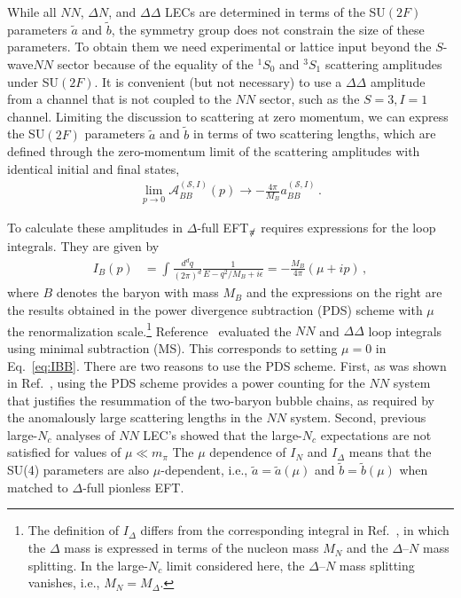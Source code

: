 \documentclass[nofootinbib, preprint, aps, prc, superscriptaddress,11pt]{revtex4-1}
\newcommand{\Nc}{\ensuremath{N_c}\xspace}
\newcommand{\NN}{\ensuremath{N\!N}\xspace}
\newcommand{\oneS}{\ensuremath{{{}^{1}\!S_0}}\xspace}
\newcommand{\threeS}{\ensuremath{{{}^{3}\!S_1}}\xspace}
\newcommand\Swave{$S$-wave\xspace}
\newcommand{\calA}{\ensuremath{\mathcal{A}}}
\newcommand{\1}{\mathbbm{1}}
\newcommand{\at}{\ensuremath{\tilde{a}}\xspace}
\newcommand{\bt}{\ensuremath{\tilde{b}}\xspace}
\newcommand{\mpi}{\ensuremath{m_\pi}}
\newcommand{\nopi}{\ensuremath{\pi\hskip-0.40em /}}
\newcommand{\eftnopi}{EFT$_{\nopi}$\xspace}
\newcommand{\D}{\ensuremath{\Delta}\xspace}
\newcommand{\DD}{\ensuremath{\Delta\Delta}\xspace}
\begin{document}
While all \NN, $\D N$, and \DD LECs are determined in terms of the SU$(2F)$ parameters \at and \bt, the symmetry group does not constrain the size of these parameters.  To obtain them we need experimental or lattice input beyond the \Swave \NN sector because of the equality of the \oneS and \threeS scattering amplitudes under SU$(2F)$.
It is convenient (but not necessary) to use a \DD amplitude from a channel that is not coupled to the \NN sector, such as the $S=3, I=1$ channel.
Limiting the discussion to scattering at zero momentum, we can express the SU$(2F)$ parameters $\at$ and $\bt$ in terms of two scattering lengths, which are defined through the zero-momentum limit of the scattering amplitudes with identical initial and final states, 
\begin{align}
\label{eq:ScatteringLengthDef}
        \lim_{p \to 0} \calA^{(\mathscr{S},I)}_{B B}(p) \to - \frac{4 \pi}{M_B} a^{(\mathscr{S},I)}_{B B} \, .
    \end{align}

To calculate these amplitudes in \D-full \eftnopi requires expressions for the loop integrals. They are given by 
\begin{align}
\label{eq:IBB}
    I_{B}(p) & = \int \frac{d^d q}{(2\pi)^d}\frac{1}{E-q^2/M_B + i\epsilon} = - \frac{M_B}{4\pi}(\mu + ip)\, , 
\end{align}
where $B$ denotes the baryon with mass $M_B$ and the expressions on the right are the results obtained in the power divergence subtraction (PDS) scheme \cite{Kaplan:1998tg} with $\mu$ the renormalization scale.\footnote{The definition of $I_{\D}$ differs from the corresponding integral in Ref.~\cite{Savage:1996tb}, in which the \D mass is expressed in terms of the nucleon mass $M_N$ and the \D{}--$N$ mass splitting.  In the large-\Nc limit considered here, the \D{}--$N$ mass splitting vanishes, i.e., $M_N=M_{\D}$.} 
Reference~\cite{Savage:1996tb} evaluated the \NN and \DD loop integrals using minimal subtraction (MS). 
This corresponds to setting $\mu = 0$ in Eq.~\eqref{eq:IBB}.
There are two reasons to use the PDS scheme. First, as was shown in Ref.~\cite{Kaplan:1998tg}, using the PDS scheme provides a power counting for the \NN system that justifies the resummation of the two-baryon bubble chains, as required by the anomalously large scattering lengths in the \NN system.
Second, previous large-\Nc analyses of \NN LEC's showed that the large-\Nc expectations  are not satisfied for values of $\mu\ll \mpi$ \cite{Kaplan:1995yg,Schindler:2018irz} 
The $\mu$ dependence of $I_{N}$ and $I_{\D}$ means that the SU(4) parameters are also $\mu$-dependent, i.e., $\at = \at(\mu)$ and $\bt = \bt(\mu)$ when matched to \D-full pionless EFT.
\end{document}
